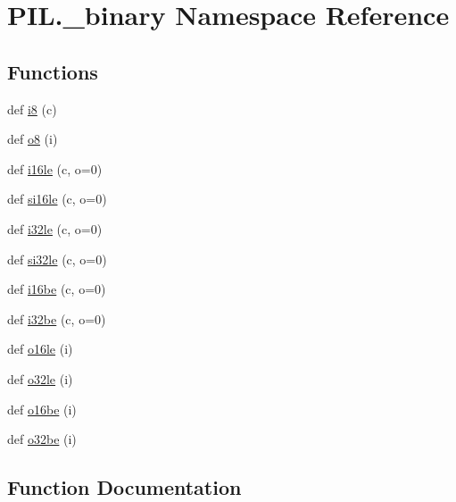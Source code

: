 \hypertarget{namespacePIL_1_1__binary}{}\section{P\+I\+L.\+\_\+binary Namespace Reference}
\label{namespacePIL_1_1__binary}
\subsection*{Functions}
\begin{DoxyCompactItemize}
\item 
def \hyperlink{namespacePIL_1_1__binary_a4605cb76d4a783b2504c18c4172745ca}{i8} (c)
\item 
def \hyperlink{namespacePIL_1_1__binary_ae249edef5438d73682825c20e57dc4bf}{o8} (i)
\item 
def \hyperlink{namespacePIL_1_1__binary_ad1b106d34378ca88022873d60e3b7762}{i16le} (c, o=0)
\item 
def \hyperlink{namespacePIL_1_1__binary_a02031d4bc51e9acba575e5d9994281fc}{si16le} (c, o=0)
\item 
def \hyperlink{namespacePIL_1_1__binary_a9eda87cd27cce462fdb53c50150db6bd}{i32le} (c, o=0)
\item 
def \hyperlink{namespacePIL_1_1__binary_a7f52cbbccb4cbb0da5360ab124f6476e}{si32le} (c, o=0)
\item 
def \hyperlink{namespacePIL_1_1__binary_a9db3c5d7bfae5e147deae459d327e6e1}{i16be} (c, o=0)
\item 
def \hyperlink{namespacePIL_1_1__binary_a6f4c8b2d2404e7b85a9843e80ddffb1c}{i32be} (c, o=0)
\item 
def \hyperlink{namespacePIL_1_1__binary_a88be3045db9e8602af976e765fead1bf}{o16le} (i)
\item 
def \hyperlink{namespacePIL_1_1__binary_a5f39166bb1da3ab991f2dac99fbb1346}{o32le} (i)
\item 
def \hyperlink{namespacePIL_1_1__binary_ae203bec873bc2585aec58d1c1afdb303}{o16be} (i)
\item 
def \hyperlink{namespacePIL_1_1__binary_a0e860a7c77b78e88ee0b8e5d079a8309}{o32be} (i)
\end{DoxyCompactItemize}


\subsection{Function Documentation}
\mbox{\label{namespacePIL_1_1__binary_a9db3c5d7bfae5e147deae459d327e6e1}} 
